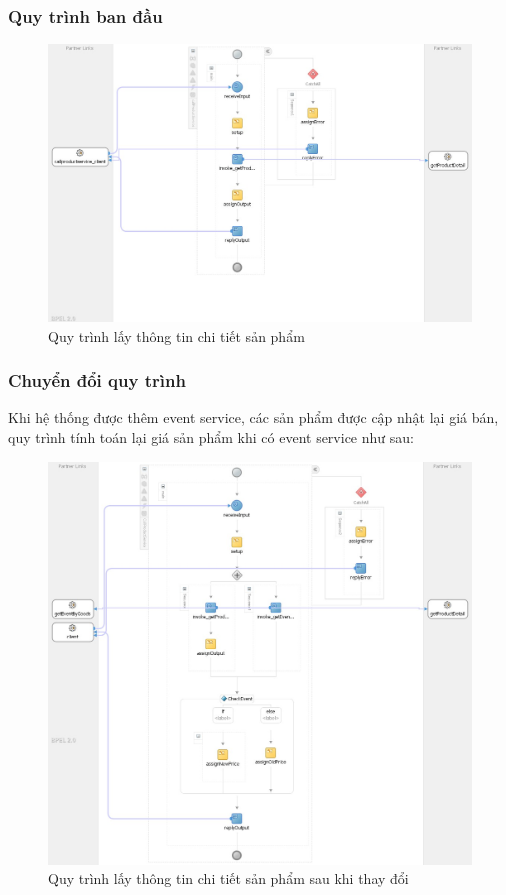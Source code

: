\subsubsection*{Quy trình ban đầu}
\begin{figure}[!htp]
    \centering
    \includegraphics[width=12cm]{img/bpel/productDetail.jpg}
    \newline
    \caption{Quy trình lấy thông tin chi tiết sản phẩm}
\end{figure}

\newpage
\subsubsection*{Chuyển đổi quy trình}
Khi hệ thống được thêm event service, các sản phẩm được cập nhật lại giá bán, quy trình tính toán lại giá sản phẩm khi có event service như sau:
\begin{figure}[!htp]
    \centering
    \includegraphics[width=14cm]{img/bpel/productDetailAfter.jpg}
    \newline
    \caption{Quy trình lấy thông tin chi tiết sản phẩm sau khi thay đổi}
\end{figure}

